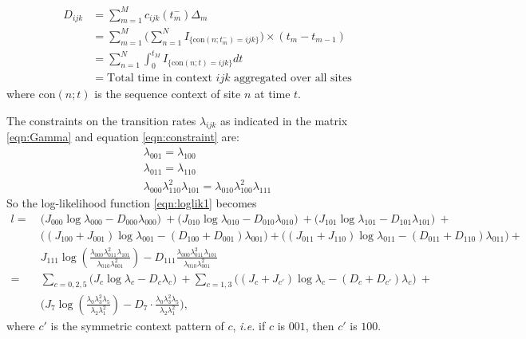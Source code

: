 \documentclass[11pt]{article}
\begin{document}
\begin{equation}\label{eqn:Dijk}
  \begin{aligned}
    D_{ijk} &= \sum_{m=1}^Mc_{ijk}(t_m^-)\Delta_m \\
    & = \sum_{m=1}^M \bigg(\sum_{n=1}^{N} I_{\{\text{con}(n; t_m^-) = ijk\}}\bigg)\times(t_m - t_{m-1}) \\
    & = \sum_{n=1}^{N}\int_{0}^{t_M} I_{\{\text{con}(n;t) = ijk\}} dt\\
    & = \text{Total time in context $ijk$ aggregated over all sites}
  \end{aligned}
\end{equation}
where $\text{con}(n; t)$ is the sequence context of site $n$ at time $t$.

The constraints on the transition rates $\lambda_{ijk}$ as indicated in
the matrix \eqref{eqn:Gamma} and equation \eqref{eqn:constraint} are:
\begin{equation}\label{eqn:constraints}
  \begin{array}{c}
    \lambda_{001} = \lambda_{100}\\
    \lambda_{011} = \lambda_{110}\\
    \lambda_{000}\lambda_{110}^2\lambda_{101} = \lambda_{010}\lambda_{100}^2\lambda_{111}
  \end{array}
\end{equation}
So the log-likelihood function \eqref{eqn:loglik1} becomes
\begin{equation}\label{eqn:loglik2}
  \begin{aligned}
    l = ~ & \bigg(J_{000}\log\lambda_{000} - D_{000}\lambda_{000}\bigg) ~ +
    \bigg(J_{010}\log\lambda_{010} - D_{010}\lambda_{010}\bigg) ~ +
    \bigg(J_{101}\log\lambda_{101} - D_{101}\lambda_{101}\bigg) ~ + \\
    & \bigg( (J_{100} + J_{001})\log\lambda_{001} - (D_{100}+D_{001})\lambda_{001}\bigg) +
    \bigg((J_{011} + J_{110})\log\lambda_{011} - (D_{011}+D_{110})\lambda_{011}\bigg) +  \\
    & J_{111}\log\left(\frac{\lambda_{000}\lambda_{011}^2\lambda_{101}}{\lambda_{010}\lambda_{001}^2}\right) - D_{111}\frac{\lambda_{000}\lambda_{011}^2\lambda_{101}}{\lambda_{010}\lambda_{001}^2} \\
    = ~ & \sum\limits_{c=0,2,5}\bigg(J_c\log\lambda_c - D_c\lambda_c\bigg) ~ +
    \sum\limits_{c=1,3} \bigg((J_c + J_{c'})\log\lambda_c - (D_c + D_{c'})\lambda_c\bigg) ~ + \\
    ~ & \bigg(J_7\log(\frac{\lambda_0\lambda_3^2\lambda_5}{\lambda_2\lambda_1^2})
    - D_7\cdot\frac{\lambda_0\lambda_3^2\lambda_5}{\lambda_2\lambda_1^2} \bigg),
  \end{aligned}
\end{equation}
where $c'$ is the symmetric context pattern of $c$, \textit{i.e.} if
$c$ is $001$, then $c'$ is $100$.
\end{document}
